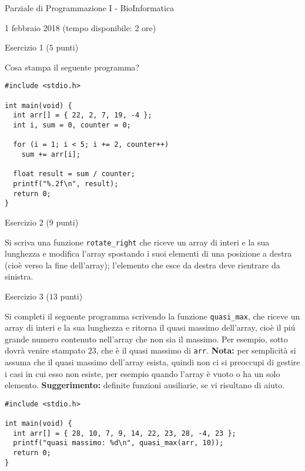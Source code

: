 \documentclass[12pt]{article}
\begin{document}
\begin{center}{\LARGE Parziale di Programmazione I - BioInformatica}\\
\vspace*{-2ex}
\begin{center}
  \large 1 febbraio 2018 (tempo disponibile: 2 ore)
\end{center}
\end{center}

\begin{center}{\Large Esercizio 1} ($5$ punti)
\end{center}

Cosa stampa il seguente programma?

\begin{lstlisting}
#include <stdio.h>

int main(void) {
  int arr[] = { 22, 2, 7, 19, -4 };
  int i, sum = 0, counter = 0;

  for (i = 1; i < 5; i += 2, counter++)
    sum += arr[i];

  float result = sum / counter;
  printf("%.2f\n", result);
  return 0;
}
\end{lstlisting}

\vspace*{1ex}
\begin{center}{\Large Esercizio 2} ($9$ punti)
\end{center}
Si scriva una funzione \texttt{rotate\_right} che riceve un array di interi e la sua lunghezza e modifica l'array spostando i suoi elementi di una posizione a destra (cio\`e verso la fine dell'array); l'elemento che esce da destra deve rientrare da sinistra.

\vspace*{1ex}
\begin{center}{\Large Esercizio 3} ($13$ punti)\end{center}
%
Si completi il seguente programma scrivendo la funzione
\texttt{quasi\_max}, che riceve un array di interi e la sua lunghezza
e ritorna il quasi massimo dell'array, cio\`e il pi\'u grande numero
contenuto nell'array che non sia il massimo. Per esempio, sotto
dovr\`a venire stampato $23$, che \`e il quasi massimo di \texttt{arr}.
\textbf{Nota:} per semplicit\`a
si assuma che il quasi massimo dell'array
esista, quindi non ci si preoccupi di gestire i casi in cui
esso non esiste, per esempio quando l'array \`e vuoto
o ha un solo elemento. \textbf{Suggerimento:} definite funzioni
ausiliarie, se vi risultano di aiuto.
%
\begin{lstlisting}
#include <stdio.h>

int main(void) {
  int arr[] = { 28, 10, 7, 9, 14, 22, 23, 28, -4, 23 };
  printf("quasi massimo: %d\n", quasi_max(arr, 10));
  return 0;
}
\end{lstlisting}
\end{document}
